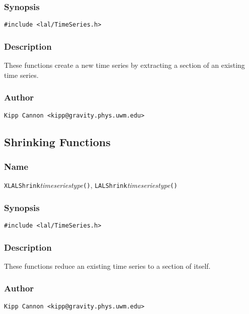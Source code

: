 \subsubsection{Synopsis}

\begin{verbatim}
#include <lal/TimeSeries.h>
\end{verbatim}


\subsubsection{Description}

These functions create a new time series by extracting a section of an
existing time series.

\subsubsection{Author}

\verb|Kipp Cannon <kipp@gravity.phys.uwm.edu>|


\subsection{Shrinking Functions}

\subsubsection{Name}

\texttt{XLALShrink}\textit{timeseriestype}\texttt{()},
\texttt{LALShrink}\textit{timeseriestype}\texttt{()}

\subsubsection{Synopsis}

\begin{verbatim}
#include <lal/TimeSeries.h>
\end{verbatim}


\subsubsection{Description}

These functions reduce an existing time series to a section of itself.

\subsubsection{Author}

\verb|Kipp Cannon <kipp@gravity.phys.uwm.edu>|
